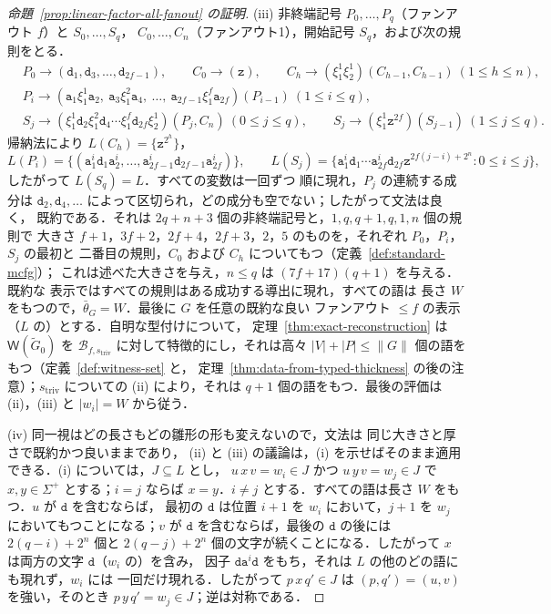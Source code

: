 \documentclass[11pt,a4paper]{ltjsarticle}
\numberwithin{equation}{section}
\theoremstyle{plain}
\theoremstyle{definition}
\theoremstyle{remark}
\newcommand{\Wit}{\mathsf{W}}
\theoremstyle{plain}
\begin{document}
\begin{proof}[命題~\ref{prop:linear-factor-all-fanout} の証明]
(iii) 非終端記号 $P_0,\ldots,P_q$（ファンアウト $f$）と $S_0,\ldots,S_q$，
$C_0,\ldots,C_n$（ファンアウト1），開始記号 $S_q$，および次の規則をとる．
\[
\begin{aligned}
 &P_0\to(\mathtt d_1,\mathtt d_3,\ldots,\mathtt d_{2f-1}),\qquad
 C_0\to(\mathtt z),\qquad
 C_h\to(\xi_1^1\xi_2^1)(C_{h-1},C_{h-1})\ (1\le h\le n),\\
 &P_i\to(\mathtt a_1\xi_1^1\mathtt a_2,\ \mathtt a_3\xi_1^2\mathtt a_4,\ \ldots,\
 \mathtt a_{2f-1}\xi_1^f\mathtt a_{2f})(P_{i-1})\ (1\le i\le q),\\
 &S_j\to(\xi_1^1\mathtt d_2\xi_1^2\mathtt d_4\cdots\xi_1^f\mathtt d_{2f}\xi_2^1)(P_j,C_n)
 \ (0\le j\le q),\qquad
 S_j\to(\xi_1^1\mathtt z^{2f})(S_{j-1})\ (1\le j\le q).
\end{aligned}
\]
帰納法により $L(C_h)=\{\mathtt z^{2^h}\}$，
\[
 L(P_i)=\{(\mathtt a_1^i\mathtt d_1\mathtt a_2^i,\ldots,
 \mathtt a_{2f-1}^i\mathtt d_{2f-1}\mathtt a_{2f}^i)\},\qquad
 L(S_j)=\{\mathtt a_1^i\mathtt d_1\cdots\mathtt a_{2f}^i\mathtt d_{2f}
 \mathtt z^{2f(j-i)+2^n}:0\le i\le j\},
\]
したがって $L(S_q)=L$．すべての変数は一回ずつ
順に現れ，$P_j$ の連続する成分は
$\mathtt d_2,\mathtt d_4,\ldots$ によって区切られ，どの成分も空でない；したがって文法は良く，
既約である．それは $2q+n+3$ 個の非終端記号と，$1,q,q+1,q,1,n$ 個の規則で
大きさ $f+1$，$3f+2$，$2f+4$，$2f+3$，$2$，$5$ のものを，それぞれ $P_0$，$P_i$，$S_j$ の最初と
二番目の規則，$C_0$ および $C_h$ についてもつ（定義~\ref{def:standard-mcfg}）；
これは述べた大きさを与え，$n\le q$ は $(7f+17)(q+1)$ を与える．既約な
表示ではすべての規則はある成功する導出に現れ，すべての語は
長さ $W$ をもつので，$\bar\theta_G=W$．最後に $G$ を任意の既約な良い
ファンアウト $\le f$ の表示（$L$ の）とする．自明な型付けについて，
定理~\ref{thm:exact-reconstruction} は $\Wit(\widetilde G_0)$ を
$\mathcal B_{f,s_{\mathrm{triv}}}$ に対して特徴的にし，それは高々
$|V|+|P|\le\|G\|$ 個の語をもつ（定義~\ref{def:witness-set} と，
定理~\ref{thm:data-from-typed-thickness} の後の注意）；$s_{\mathrm{triv}}$ についての (ii) により，それは
$q+1$ 個の語をもつ．最後の評価は (ii)，(iii) と $|w_i|=W$ から従う．

(iv) 同一視はどの長さもどの雛形の形も変えないので，文法は
同じ大きさと厚さで既約かつ良いままであり，
(ii) と (iii) の議論は，(i) を示せばそのまま適用できる．(i) については，$J\subseteq L$ とし，
$u\,x\,v=w_i\in J$ かつ $u\,y\,v=w_j\in J$ で $x,y\in\Sigma^+$ とする；$i=j$ ならば
$x=y$．$i\ne j$ とする．すべての語は長さ $W$ をもつ．$u$ が $\mathtt d$ を含むならば，
最初の $\mathtt d$ は位置 $i+1$ を $w_i$ において，$j+1$ を $w_j$ においてもつことになる；$v$ が
$\mathtt d$ を含むならば，最後の $\mathtt d$ の後には $2(q-i)+2^n$ 個と
$2(q-j)+2^n$ 個の文字が続くことになる．したがって $x$ は両方の文字 $\mathtt d$（$w_i$ の）を含み，
因子 $\mathtt d\mathtt a^i\mathtt d$ をもち，それは $L$ の他のどの語にも現れず，$w_i$ には
一回だけ現れる．したがって $p\,x\,q'\in J$ は $(p,q')=(u,v)$ を強い，そのとき
$p\,y\,q'=w_j\in J$；逆は対称である．
\end{proof}
\end{document}
